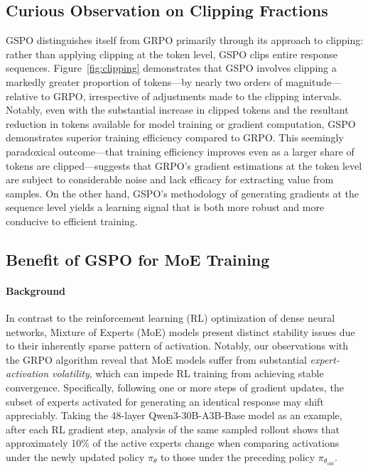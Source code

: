 \subsection{Curious Observation on Clipping Fractions}

GSPO distinguishes itself from GRPO primarily through its approach to clipping: rather than applying clipping at the token level, GSPO clips entire response sequences. Figure~\ref{fig:clipping} demonstrates that GSPO involves clipping a markedly greater proportion of tokens—by nearly two orders of magnitude—relative to GRPO, irrespective of adjustments made to the clipping intervals. Notably, even with the substantial increase in clipped tokens and the resultant reduction in tokens available for model training or gradient computation, GSPO demonstrates superior training efficiency compared to GRPO. This seemingly paradoxical outcome—that training efficiency improves even as a larger share of tokens are clipped—suggests that GRPO's gradient estimations at the token level are subject to considerable noise and lack efficacy for extracting value from samples. On the other hand, GSPO's methodology of generating gradients at the sequence level yields a learning signal that is both more robust and more conducive to efficient training.

\subsection{Benefit of GSPO for MoE Training}
\label{subsec:routing_replay}

\paragraph{Background}
In contrast to the reinforcement learning (RL) optimization of dense neural networks, Mixture of Experts (MoE) models present distinct stability issues due to their inherently sparse pattern of activation. Notably, our observations with the GRPO algorithm reveal that MoE models suffer from substantial \textit{expert-activation volatility}, which can impede RL training from achieving stable convergence. Specifically, following one or more steps of gradient updates, the subset of experts activated for generating an identical response may shift appreciably. Taking the 48-layer Qwen3-30B-A3B-Base model as an example, after each RL gradient step, analysis of the same sampled rollout shows that approximately 10\% of the active experts change when comparing activations under the newly updated policy $\pi_{\theta}$ to those under the preceding policy $\pi_{\theta_\text{old}}$.


